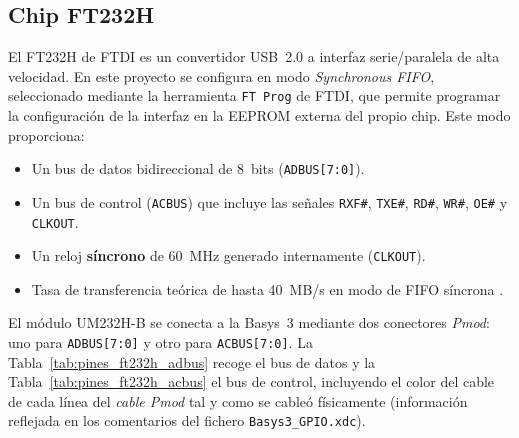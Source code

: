 \documentclass[../main.tex]{subfiles}
\begin{document}
\subsection{Chip FT232H}

El FT232H de FTDI es un convertidor USB~2.0 a interfaz serie/paralela de alta velocidad. En este proyecto se configura en modo \textit{Synchronous FIFO}, seleccionado mediante la herramienta \texttt{FT Prog} de FTDI, que permite programar la configuración de la interfaz en la \ac{EEPROM} externa del propio chip. Este modo proporciona:

\begin{itemize}
    \item Un bus de datos bidireccional de 8~bits (\texttt{ADBUS[7:0]}).
    \item Un bus de control (\texttt{ACBUS}) que incluye las señales \texttt{RXF\#}, \texttt{TXE\#}, \texttt{RD\#}, \texttt{WR\#}, \texttt{OE\#} y \texttt{CLKOUT}.
    \item Un reloj \textbf{síncrono} de 60~MHz generado internamente (\texttt{CLKOUT}).
    \item Tasa de transferencia teórica de hasta 40~MB/s en modo de FIFO síncrona \cite{ft232h_datasheet}.
\end{itemize}

El módulo UM232H-B se conecta a la Basys~3 mediante dos conectores \textit{Pmod}: uno para \texttt{ADBUS[7:0]} y otro para \texttt{ACBUS[7:0]}. La Tabla~\ref{tab:pines_ft232h_adbus} recoge el bus de datos y la Tabla~\ref{tab:pines_ft232h_acbus} el bus de control, incluyendo el color del cable de cada línea del \textit{cable Pmod} tal y como se cableó físicamente (información reflejada en los comentarios del fichero \texttt{Basys3\_GPIO.xdc}).
\end{document}
